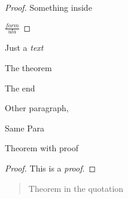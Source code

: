 \begin{proof}

Something inside

\(\frac {form}{ula}\)

\end{proof}

Just a \emph{text}

\begin{theorem}

The theorem

\end{theorem}

The end

Other paragraph,

\begin{theorem} Same Para \end{theorem}

\begin{theorem} Theorem with proof

\begin{proof} This is a \emph{proof}. \end{proof}

\end{theorem}

\begin{quote}
\begin{theorem} Theorem in the quotation \end{theorem}
\end{quote}
